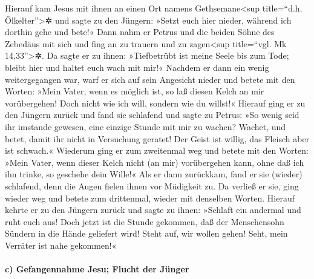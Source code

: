  Hierauf kam Jesus mit ihnen an einen Ort namens
Gethsemane\textless sup title=``d.h. Ölkelter''\textgreater✲ und sagte
zu den Jüngern: »Setzt euch hier nieder, während ich dorthin gehe und
bete!«  Dann nahm er Petrus und die beiden Söhne des
Zebedäus mit sich und fing an zu trauern und zu zagen\textless sup
title=``vgl. Mk 14,33''\textgreater✲.  Da sagte er zu
ihnen: »Tiefbetrübt ist meine Seele bis zum Tode; bleibt hier und haltet
euch wach mit mir!«  Nachdem er dann ein wenig
weitergegangen war, warf er sich auf sein Angesicht nieder und betete
mit den Worten: »Mein Vater, wenn es möglich ist, so laß diesen Kelch an
mir vorübergehen! Doch nicht wie ich will, sondern wie du willst!«
 Hierauf ging er zu den Jüngern zurück und fand sie
schlafend und sagte zu Petrus: »So wenig seid ihr imstande gewesen, eine
einzige Stunde mit mir zu wachen?  Wachet, und betet,
damit ihr nicht in Versuchung geratet! Der Geist ist willig, das Fleisch
aber ist schwach.«  Wiederum ging er zum zweitenmal weg
und betete mit den Worten: »Mein Vater, wenn dieser Kelch nicht (an mir)
vorübergehen kann, ohne daß ich ihn trinke, so geschehe dein Wille!«
 Als er dann zurückkam, fand er sie (wieder) schlafend,
denn die Augen fielen ihnen vor Müdigkeit zu.  Da verließ
er sie, ging wieder weg und betete zum drittenmal, wieder mit denselben
Worten.  Hierauf kehrte er zu den Jüngern zurück und
sagte zu ihnen: »Schlaft ein andermal und ruht euch aus! Doch jetzt ist
die Stunde gekommen, daß der Menschensohn Sündern in die Hände geliefert
wird!  Steht auf, wir wollen gehen! Seht, mein Verräter
ist nahe gekommen!«

\hypertarget{c-gefangennahme-jesu-flucht-der-juxfcnger}{%
\paragraph{c) Gefangennahme Jesu; Flucht der
Jünger}\label{c-gefangennahme-jesu-flucht-der-juxfcnger}}

